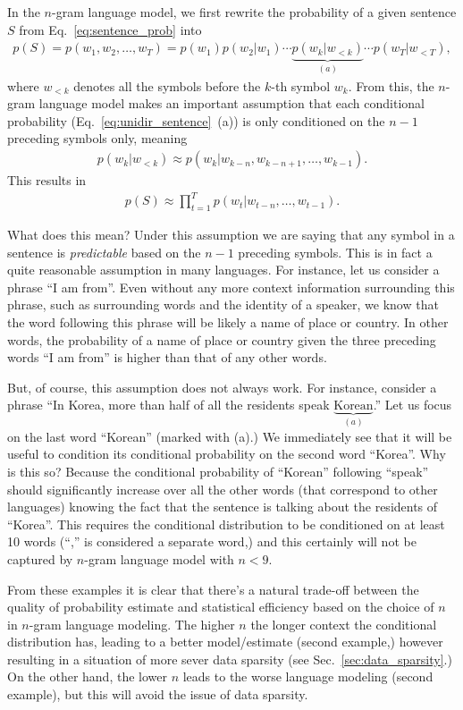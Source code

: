 \documentclass{report}
\begin{document}
In the $n$-gram language model, we first rewrite the probability of a given
sentence $S$ from Eq.~\eqref{eq:sentence_prob} into
\begin{align}
    \label{eq:unidir_sentence}
    p(S) = p(w_1, w_2, \ldots, w_T) = p(w_1)p(w_2|w_1)\cdots
    \underbrace{p(w_k|w_{<k})}_{(a)}
    \cdots p(w_T|w_{<T}),
\end{align}
where $w_{<k}$ denotes all the symbols before the $k$-th symbol $w_k$. From
this, the $n$-gram language model makes an important assumption that each
conditional probability (Eq.~\eqref{eq:unidir_sentence}~(a)) is only conditioned
on the $n-1$ preceding symbols only, meaning
\begin{align*}
    p(w_k | w_{<k}) \approx p(w_k | w_{k-n}, w_{k-n+1}, \ldots, w_{k-1}).
\end{align*}
This results in 
\begin{align*}
    p(S) \approx \prod_{t=1}^T p(w_t | w_{t-n}, \ldots, w_{t-1}).
\end{align*}

What does this mean? Under this assumption we are saying that any symbol in a
sentence is {\em predictable} based on the $n-1$ preceding symbols. This is in
fact a quite reasonable assumption in many languages. For instance, let us
consider a phrase ``I am from''. Even without any more context information
surrounding this phrase, such as surrounding words and the identity of a
speaker, we know that the word following this phrase will be likely a name of
place or country. In other words, the probability of a name of place or country
given the three preceding words ``I am from'' is higher than that of any other
words. 

But, of course, this assumption does not always work. For instance, consider a
phrase ``In Korea, more than half of all the residents speak
$\underbrace{\text{Korean}}_{(a)}$.'' Let us focus on the last word ``Korean''
(marked with (a).) We immediately see that it will be useful to condition its
conditional probability on the second word ``Korea''. Why is this so? Because
the conditional probability of ``Korean'' following ``speak'' should
significantly increase over all the other words (that correspond to other
languages) knowing the fact that the sentence is talking about the residents of
``Korea''. This requires the conditional distribution to be conditioned on at
least 10 words (``,'' is considered a separate word,) and this certainly will
not be captured by $n$-gram language model with $n < 9$.  

From these examples it is clear that there's a natural trade-off between the
quality of probability estimate and statistical efficiency based on the choice
of $n$ in $n$-gram language modeling. The higher $n$ the longer context the
conditional distribution has, leading to a better model/estimate (second
example,) however resulting in a situation of more sever data sparsity (see
Sec.~\ref{sec:data_sparsity}.) On the other hand, the lower $n$ leads to the
worse language modeling (second example), but this will avoid the issue of data
sparsity. 
\end{document}
